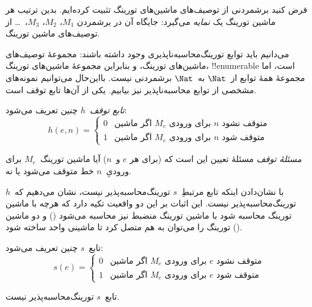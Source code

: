 \documentclass[../../../include/open-logic-section]{subfiles}
\begin{document}

\begin{explain}
فرض کنید برشمردنی از توصیف‌های ماشین‌های تورینگ تثبیت کرده‌ایم. بدین
ترتیب هر ماشین تورینگ یک \emph{نمایه} می‌گیرد: جایگاه آن در برشمردن
$M_1$، $M_2$، $M_3$،~\dots{} از توصیف‌های ماشین تورینگ.

می‌دانیم باید توابع تورینگ‌محاسبه‌ناپذیری وجود داشته باشند: مجموعهٔ
توصیف‌های ماشین‌های تورینگ، و بنابراین مجموعهٔ ماشین‌های تورینگ،
!!{enumerable} است، اما مجموعهٔ همهٔ توابع از~$\Nat$ به~$\Nat$
برشمردنی نیست. بااین‌حال می‌توانیم نمونه‌های مشخصی از توابع
محاسبه‌ناپذیر نیز بیابیم. یکی از آن‌ها تابع توقف است.
\end{explain}

\begin{defn}
 \emph{تابع توقف}~$h$ چنین تعریف می‌شود:
\[
h(e,n)=
\begin{cases}
  \text{0} & \text{اگر ماشین~$M_e$ برای ورودی~$n$ متوقف نشود} \\
  \text{1} & \text{اگر ماشین~$M_e$ برای ورودی~$n$ متوقف شود}
\end{cases}
\]
\end{defn}

\begin{defn}
\emph{مسئلهٔ توقف} مسئلهٔ تعیین این است که (برای هر $e$ و~$n$) آیا
ماشین تورینگ~$M_e$ برای ورودیِ~$n$ خط متوقف می‌شود یا نه.
\end{defn}

\begin{explain}
با نشان‌دادن اینکه تابع مرتبطِ~$s$ تورینگ‌محاسبه‌پذیر نیست، نشان
می‌دهیم که~$h$ تورینگ‌محاسبه‌پذیر نیست. این اثبات بر این دو واقعیت
تکیه دارد که هرچه با ماشین تورینگ محاسبه شود با ماشین تورینگ منضبط
نیز محاسبه می‌شود () و دو ماشین تورینگ را می‌توان
به هم متصل کرد تا ماشینی واحد ساخته شود ().
\end{explain}

\begin{defn} تابع~$s$ چنین تعریف می‌شود:
\[
s(e)=
\begin{cases}
  \text{0} & \text{اگر ماشین~$M_e$ برای ورودی~$e$ متوقف نشود} \\
  \text{1} & \text{اگر ماشین~$M_e$ برای ورودی~$e$ متوقف شود}
\end{cases}
\]
\end{defn}

\begin{lem}
تابع~$s$ تورینگ‌محاسبه‌پذیر نیست.
\end{lem}
\end{document}
